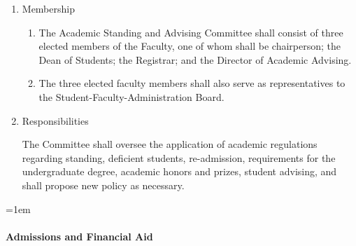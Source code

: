 \documentclass{manual}
\let\oldparagraph\paragraph
\renewcommand\paragraph{\leftskip=1em\oldparagraph}
\newcommand{\itemLevelA}{\alph*.}
\newcommand{\itemLevelB}{\arabic*)}
\newcommand{\itemRefA}{\alph*}
\newcommand{\itemRefB}{\arabic*}
\begin{document}
\begin{enumerate}[label=\itemLevelA,ref=\itemRefA]
\item Membership
\begin{enumerate}[label=\itemLevelB,ref=\itemRefB]
\item The Academic Standing and Advising Committee shall consist of three elected members of the Faculty, one of whom shall be chairperson; the Dean of Students; the Registrar; and the Director of Academic Advising.
\item The three elected faculty members shall also serve as representatives to the Student-Faculty-Administration Board.
\end{enumerate}
\item Responsibilities

The Committee shall oversee the application of academic regulations regarding standing, deficient students, re-admission, requirements for the undergraduate degree, academic honors and prizes, student advising, and shall propose new policy as necessary.

\end{enumerate}

\paragraph{Admissions and Financial Aid}
\end{document}
